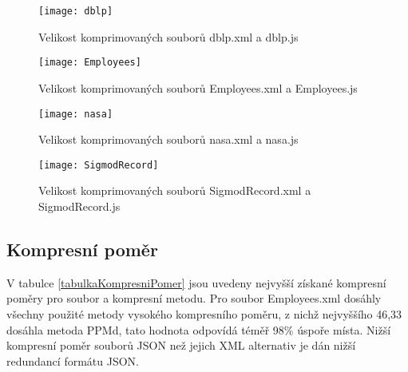 \begin{figure}[!h]
\centering
\texttt{[image: dblp]}
\caption{Velikost komprimovaných souborů dblp.xml a dblp.js}
\label{dblp}
\end{figure}

\begin{figure}[!h]
\centering
\texttt{[image: Employees]}
\caption{Velikost komprimovaných souborů Employees.xml a Employees.js}
\label{Employees}
\end{figure}

\begin{figure}[!h]
\centering
\texttt{[image: nasa]}
\caption{Velikost komprimovaných souborů nasa.xml a nasa.js}
\label{nasa}
\end{figure}

\begin{figure}[!h]
\centering
\texttt{[image: SigmodRecord]}
\caption{Velikost komprimovaných souborů SigmodRecord.xml a SigmodRecord.js}
\label{SigmodRecord}
\end{figure}

\clearpage
\subsection{Kompresní poměr}
V tabulce \ref{tabulkaKompresniPomer} jsou uvedeny nejvyšší získané kompresní poměry pro soubor a kompresní metodu. Pro soubor Employees.xml dosáhly všechny použité metody vysokého kompresního poměru, z nichž nejvyššího 46,33 dosáhla metoda PPMd, tato hodnota odpovídá téměř 98\% úspoře místa. Nižší kompresní poměr souborů JSON než jejich XML alternativ je dán nižší redundancí formátu JSON.

